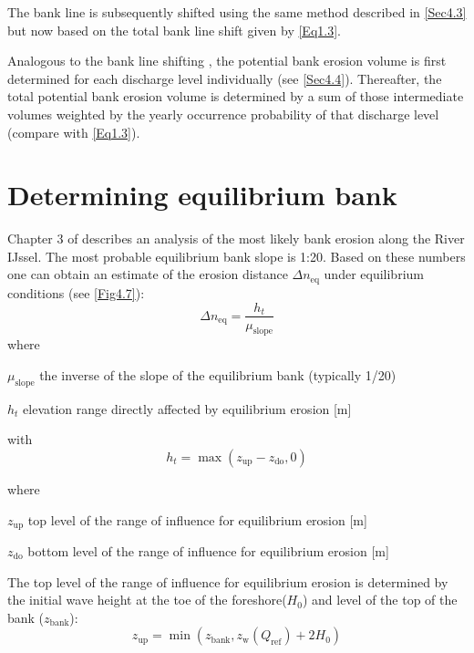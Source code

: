 The bank line is subsequently shifted using the same method described in \autoref{Sec4.3} but now based on the total bank line shift given by \autoref{Eq1.3}.

Analogous to the bank line shifting , the potential bank erosion volume is first determined for each discharge level individually (see \autoref{Sec4.4}).
Thereafter, the total potential bank erosion volume is determined by a sum of those intermediate volumes weighted by the yearly occurrence probability of that discharge level (compare with \autoref{Eq1.3}).

\section{Determining equilibrium bank}\label{Sec4.6}

Chapter 3 of \citet{MarkSBMV11} describes an analysis of the most likely bank erosion along the River IJssel.
The most probable equilibrium bank slope is 1:20.
Based on these numbers one can obtain an estimate of the erosion distance $\Delta n_\text{eq}$ under equilibrium conditions (see \autoref{Fig4.7}):
%
\begin{equation}
\Delta n_\text{eq} = \frac{h_t}{\mu_\text{slope}}
\end{equation}
%
where
\begin{symbollist}
\item[ $\mu_\text{slope}$] the inverse of the slope of the equilibrium bank (typically 1/20)
\item[$h_t$] elevation range directly affected by equilibrium erosion [m]
\end{symbollist}

with 
\begin{equation}
h_t = \max (z_\text{up} - z_\text{do}, 0)
\end{equation}

where
\begin{symbollist}
\item[ $z_\text{up}$] top level of the range of influence for equilibrium erosion [m]
\item[$z_\text{do}$] bottom level of the range of influence for equilibrium erosion [m]
\end{symbollist}	

The top level of the range of influence for equilibrium erosion is determined by the initial wave height at the toe of the foreshore($H_0$) and level of the top of the bank ($z_\text{bank}$):
\begin{equation}	
z_\text{up} = \min (z_\text{bank}, z_\text{w}(Q_\text{ref}) + 2 H_\text{0})
\end{equation}

